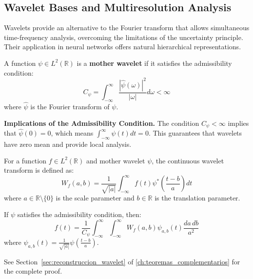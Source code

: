 \subsection{Wavelet Bases and Multiresolution Analysis}\label{subsec:wavelets_multirresolucion}

Wavelets provide an alternative to the Fourier transform that allows simultaneous time-frequency analysis, overcoming the limitations of the uncertainty principle. Their application in neural networks offers natural hierarchical representations.

\begin{definition}\label{def:wavelet_madre}
A function $\psi \in L^2(\mathbb{R})$ is a \textbf{mother wavelet} if it satisfies the admissibility condition:
\begin{equation}
C_\psi = \int_{-\infty}^{\infty} \frac{|\hat{\psi}(\omega)|^2}{|\omega|} d\omega < \infty
\end{equation}
where $\hat{\psi}$ is the Fourier transform of $\psi$.
\end{definition}

\textbf{Implications of the Admissibility Condition.} The condition $C_\psi < \infty$ implies that $\hat{\psi}(0) = 0$, which means $\int_{-\infty}^{\infty} \psi(t) dt = 0$. This guarantees that wavelets have zero mean and provide local analysis.

\begin{definition}\label{def:transformada_wavelet_continua}
For a function $f \in L^2(\mathbb{R})$ and mother wavelet $\psi$, the continuous wavelet transform is defined as:
\begin{equation}
W_f(a, b) = \frac{1}{\sqrt{|a|}} \int_{-\infty}^{\infty} f(t) \psi^*\left(\frac{t-b}{a}\right) dt
\end{equation}
where $a \in \mathbb{R}\setminus\{0\}$ is the scale parameter and $b \in \mathbb{R}$ is the translation parameter.
\end{definition}

\begin{theorem}\label{thm:reconstruccion_wavelet}
If $\psi$ satisfies the admissibility condition, then:
\begin{equation}
f(t) = \frac{1}{C_\psi} \int_{-\infty}^{\infty} \int_{-\infty}^{\infty} W_f(a, b) \psi_{a,b}(t) \frac{da \, db}{a^2}
\end{equation}
where $\psi_{a,b}(t) = \frac{1}{\sqrt{|a|}} \psi\left(\frac{t-b}{a}\right)$.

See Section~\ref{sec:reconstruccion_wavelet} of \autoref{ch:teoremas_complementarios} for the complete proof.
\end{theorem}

